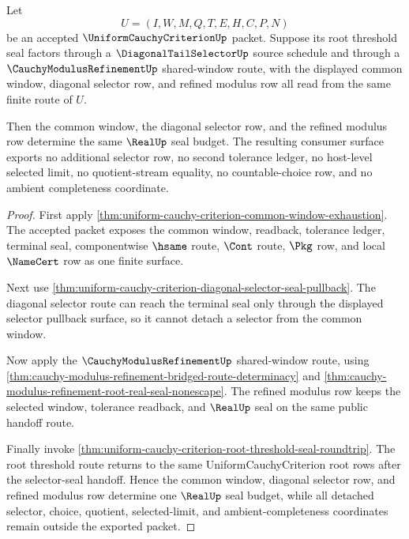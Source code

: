 \begin{theorem}
\label{thm:uniform-cauchy-criterion-common-window-diagonal-selector-coherence}
Let
$$
U=(I,W,M,Q,T,E,H,C,P,N)
$$
be an accepted $\UniformCauchyCriterionUp$ packet. Suppose its root threshold seal factors through a $\DiagonalTailSelectorUp$ source schedule and through a $\CauchyModulusRefinementUp$ shared-window route, with the displayed common window, diagonal selector row, and refined modulus row all read from the same finite route of $U$.

Then the common window, the diagonal selector row, and the refined modulus row determine the same $\RealUp$ seal budget. The resulting consumer surface exports no additional selector row, no second tolerance ledger, no host-level selected limit, no quotient-stream equality, no countable-choice row, and no ambient completeness coordinate.
\end{theorem}
\begin{proof}
First apply \autoref{thm:uniform-cauchy-criterion-common-window-exhaustion}. The accepted packet exposes the common window, readback, tolerance ledger, terminal seal, componentwise $\hsame$ route, $\Cont$ route, $\Pkg$ row, and local $\NameCert$ row as one finite surface.

Next use \autoref{thm:uniform-cauchy-criterion-diagonal-selector-seal-pullback}. The diagonal selector route can reach the terminal seal only through the displayed selector pullback surface, so it cannot detach a selector from the common window.

Now apply the $\CauchyModulusRefinementUp$ shared-window route, using \autoref{thm:cauchy-modulus-refinement-bridged-route-determinacy} and \autoref{thm:cauchy-modulus-refinement-root-real-seal-nonescape}. The refined modulus row keeps the selected window, tolerance readback, and $\RealUp$ seal on the same public handoff route.

Finally invoke \autoref{thm:uniform-cauchy-criterion-root-threshold-seal-roundtrip}. The root threshold route returns to the same UniformCauchyCriterion root rows after the selector-seal handoff. Hence the common window, diagonal selector row, and refined modulus row determine one $\RealUp$ seal budget, while all detached selector, choice, quotient, selected-limit, and ambient-completeness coordinates remain outside the exported packet.
\end{proof}

